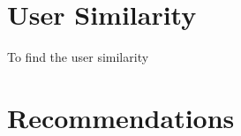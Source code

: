 \section{User Similarity}
To find the user similarity


\section{Recommendations}



\begin{appendices}

\clearpage

%

\end{appendices}



% 




